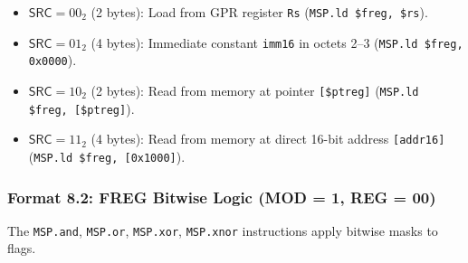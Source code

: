 \documentclass[11pt,a4paper]{article}
\newcommand{\reg}[1]{\texttt{#1}}
\newcommand{\field}[1]{\textsf{#1}}
\begin{document}
\begin{itemize}
  \item $\field{SRC} = 00_2$ (2 bytes): Load from GPR register \reg{Rs} (\texttt{MSP.ld \$freg, \$rs}).
  \item $\field{SRC} = 01_2$ (4 bytes): Immediate constant \texttt{imm16} in octets 2--3 (\texttt{MSP.ld \$freg, 0x0000}).
  \item $\field{SRC} = 10_2$ (2 bytes): Read from memory at pointer \texttt{[\$ptreg]} (\texttt{MSP.ld \$freg, [\$ptreg]}).
  \item $\field{SRC} = 11_2$ (4 bytes): Read from memory at direct 16-bit address \texttt{[addr16]} (\texttt{MSP.ld \$freg, [0x1000]}).
\end{itemize}

\subsubsection{Format 8.2: FREG Bitwise Logic (MOD = 1, REG = 00)}
The \texttt{MSP.and}, \texttt{MSP.or}, \texttt{MSP.xor}, \texttt{MSP.xnor} instructions apply bitwise masks to flags.
\end{document}
